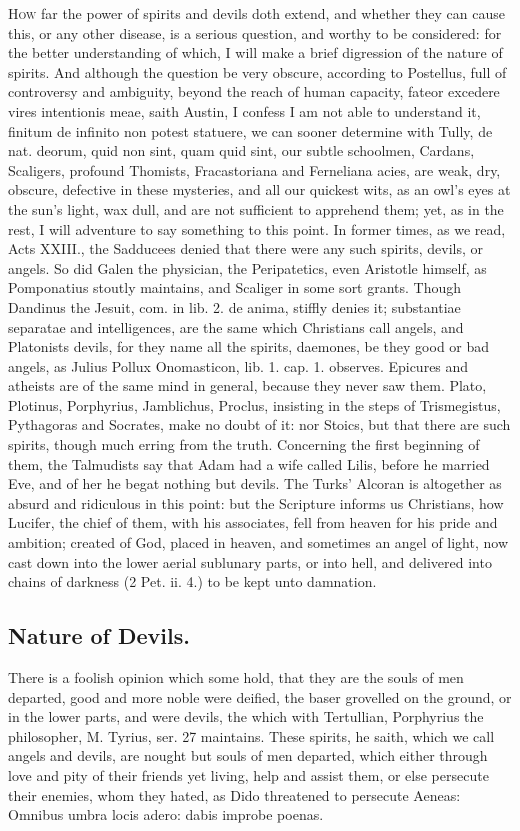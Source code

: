 {\lettrine{H}{ow} far the power of spirits and devils doth extend, and whether they
can cause this, or any other disease, is a serious question, and worthy
to be considered: for the better understanding of which, I will make a
brief digression of the nature of spirits. And although the question be
very obscure, according to Postellus, full of controversy and
ambiguity, beyond the reach of human capacity, fateor excedere vires
intentionis meae, saith Austin, I confess I am not able to
understand it, finitum de infinito non potest statuere, we can sooner
determine with Tully, de nat. deorum, quid non sint, quam quid sint,
our subtle schoolmen, Cardans, Scaligers, profound Thomists,
Fracastoriana and Ferneliana acies, are weak, dry, obscure, defective
in these mysteries, and all our quickest wits, as an owl's eyes at the
sun's light, wax dull, and are not sufficient to apprehend them; yet,
as in the rest, I will adventure to say something to this point. In
former times, as we read, Acts XXIII., the Sadducees denied that there
were any such spirits, devils, or angels. So did Galen the physician,
the Peripatetics, even Aristotle himself, as Pomponatius stoutly
maintains, and Scaliger in some sort grants. Though Dandinus the
Jesuit, com. in lib. 2. de anima, stiffly denies it; substantiae
separatae and intelligences, are the same which Christians call angels,
and Platonists devils, for they name all the spirits, daemones, be they
good or bad angels, as Julius Pollux Onomasticon, lib. 1. cap. 1.
observes. Epicures and atheists are of the same mind in general,
because they never saw them. Plato, Plotinus, Porphyrius, Jamblichus,
Proclus, insisting in the steps of Trismegistus, Pythagoras and
Socrates, make no doubt of it: nor Stoics, but that there are such
spirits, though much erring from the truth. Concerning the first
beginning of them, the Talmudists say that Adam had a wife called
Lilis, before he married Eve, and of her he begat nothing but devils.
The Turks' Alcoran is altogether as absurd and ridiculous in this
point: but the Scripture informs us Christians, how Lucifer, the chief
of them, with his associates, fell from heaven for his pride and
ambition; created of God, placed in heaven, and sometimes an angel of
light, now cast down into the lower aerial sublunary parts, or into
hell, and delivered into chains of darkness (2 Pet. ii. 4.) to be kept
unto damnation.
\subsection{Nature of Devils.}
There is a foolish opinion which some hold, that
they are the souls of men departed, good and more noble were deified,
the baser grovelled on the ground, or in the lower parts, and were
devils, the which with Tertullian, Porphyrius the philosopher, M.
Tyrius, ser. 27 maintains. These spirits, he saith, which we call
angels and devils, are nought but souls of men departed, which either
through love and pity of their friends yet living, help and assist
them, or else persecute their enemies, whom they hated, as Dido
threatened to persecute Aeneas:
Omnibus umbra locis adero: dabis improbe poenas.

}
